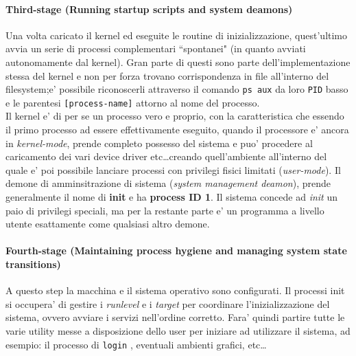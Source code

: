 \paragraph{Third-stage (Running startup scripts and system deamons)}
Una volta caricato il kernel ed eseguite le routine di inizializzazione, quest'ultimo avvia un serie di processi complementari ``spontanei" (in quanto avviati autonomamente dal kernel). Gran parte di questi sono parte dell'implementazione stessa del kernel e non per forza trovano corrispondenza in file all'interno del filesystem;e' possibile riconoscerli attraverso il comando \texttt{ps aux} da loro \texttt{PID} basso e le parentesi \texttt{[process-name]} attorno al nome del processo.
\\
Il kernel e' di per se un processo vero e proprio, con la caratteristica che essendo il primo processo ad essere effettivamente eseguito, quando il processore e' ancora in \emph{kernel-mode}, prende completo possesso del sistema e puo' procedere al caricamento dei vari device driver etc\dots creando quell'ambiente all'interno del quale e' poi possibile lanciare processi con privilegi fisici limitati (\emph{user-mode}). Il demone di amminsitrazione di sistema (\emph{system management deamon}), prende generalmente il nome di \textbf{init} e ha \textbf{process ID 1}. Il sistema concede ad \emph{init} un paio di privilegi speciali, ma per la restante parte e' un programma a livello utente esattamente come qualsiasi altro demone.

\newpage
\paragraph{Fourth-stage (Maintaining process hygiene and managing system state transitions)}
A questo step la macchina e il sistema operativo sono configurati. Il processi init si occupera' di gestire i \emph{runlevel} e i \emph{target} per coordinare l'inizializzazione del sistema, ovvero avviare i servizi nell'ordine corretto. Fara' quindi partire tutte le varie utility messe a disposizione dello user per iniziare ad utilizzare il sistema, ad esempio: il processo di \texttt{login} , eventuali ambienti grafici, etc\dots




